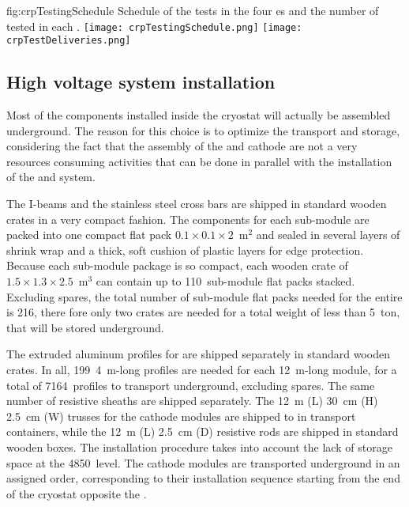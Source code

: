 \begin{dunefigure}{fig:crpTestingSchedule}
{Schedule of the  tests in the four  \coldbox{}es and the number of  tested in each  \coldbox.}
\texttt{[image: crpTestingSchedule.png]}
\texttt{[image: crpTestDeliveries.png]}
\end{dunefigure}


\subsection{High voltage system installation}
Most of the  components installed inside the cryostat will actually be assembled underground.
The reason for this choice is to optimize the transport and storage, considering the fact that the assembly of the  and cathode are not a very resources consuming activities that can be done in parallel with the installation of the  and  system.

The   I-beams and the stainless steel cross bars are shipped in standard wooden crates in a very compact fashion.
The components for each  sub-module are packed into one compact flat pack $0.1 \times 0.1 \times 2$~m$^2$ and sealed in several layers of shrink wrap and a thick, soft cushion of plastic layers for edge protection.
Because each sub-module package is so compact, each wooden crate of $1.5 \times 1.3 \times 2.5$~m$^3$ can contain up to 110~sub-module flat packs stacked.
Excluding spares, the total number of sub-module flat packs needed for the entire  is 216, there fore only two crates are needed for a total weight of less than 5~ton, that will be stored underground.

The extruded aluminum profiles for  are shipped separately in standard wooden crates.
In all, 199~4~m-long profiles are needed for each 12~m-long  module, for a total of 7164~profiles to transport underground, excluding spares.
The same number of resistive sheaths are shipped separately.
The 12~m (L) 30~cm (H) 2.5~cm (W) trusses for the cathode modules are shipped to  in transport containers, while the 12~m (L) 2.5~cm (D) resistive rods are shipped in standard wooden boxes.
The installation procedure takes into account the lack of storage space at the 4850~level.
The cathode modules are transported underground in an assigned order, corresponding to their installation sequence starting from the end of the cryostat opposite the .

